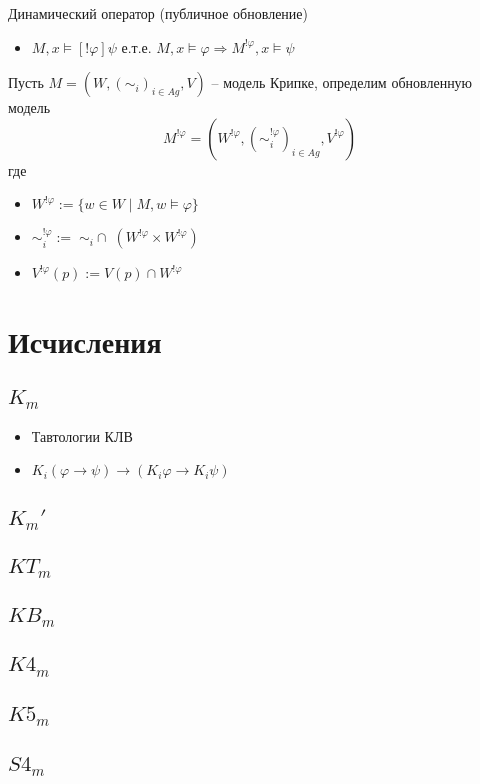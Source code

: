 \documentclass[11pt]{article}
\begin{document}
Динамический оператор (публичное обновление)
\begin{itemize}
\item $M, x \models [!\varphi]\psi$ е.т.е.
$M, x \models \varphi \Rightarrow M^{!\varphi}, x \models \psi$
\end{itemize}

Пусть $M= (W, (\sim_i)_{i \in Ag},  V)$ – модель Крипке, определим обновленную модель
$$M^{!\varphi}= (W^{!\varphi}, (\sim^{!\varphi}_i)_{i \in Ag},  V^{!\varphi})$$ 
где
\begin{itemize}
\item $W^{!\varphi}:= \{w \in W \mid M, w \models \varphi \}$
\item $\sim^{!\varphi}_i:=\; \sim_{i} \cap \; (W^{!\varphi} \times W^{!\varphi})  $
\item $V^{!\varphi}(p):= V(p) \cap W^{!\varphi}$	
\end{itemize}


\section{Исчисления}
\subsection{$K_m$}
\begin{itemize}
\item Тавтологии КЛВ
\item $K_i (\varphi \to \psi) \to (K_i \varphi \to K_i \psi) $	
\end{itemize}

\subsection{$K_m'$}
\subsection{$KT_m$}
\subsection{$KB_m$}
\subsection{$K4_m$}
\subsection{$K5_m$}

\subsection{$S4_m$}
\end{document}
